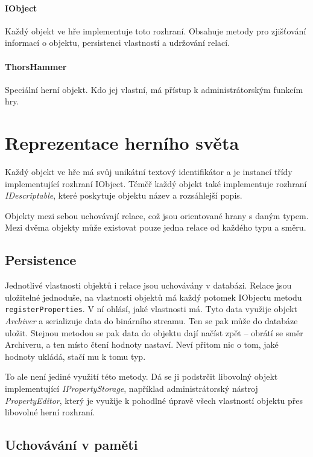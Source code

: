 \documentclass[11pt, a4paper]{article}
\def\class#1{\emph{#1}}
\begin{document}
\paragraph{IObject} Každý objekt ve hře implementuje toto rozhraní. Obsahuje metody pro zjišťování informací o objektu, persistenci vlastností a udržování relací.

\paragraph{ThorsHammer} Speciální herní objekt. Kdo jej vlastní, má přístup k administrátorským funkcím hry.

\section{Reprezentace herního světa}

Každý objekt ve hře má svůj unikátní textový identifikátor a je instancí třídy implementující rozhraní IObject. Téměř každý objekt také implementuje rozhraní \class{IDescriptable}, které poskytuje objektu název a rozsáhlejší popis. 

Objekty mezi sebou uchovávají relace, což jsou orientované hrany s daným typem. Mezi dvěma objekty může existovat pouze jedna relace od každého typu a směru.

\subsection{Persistence}

Jednotlivé vlastnosti objektů i relace jsou uchovávány v databázi. Relace jsou uložitelné jednoduše, na vlastnosti objektů má každý potomek IObjectu metodu \texttt{registerProperties}. V ní ohlásí, jaké vlastnosti má. Tyto data využije objekt \class{Archiver} a serializuje data do binárního streamu. Ten se pak může do databáze uložit. Stejnou metodou se pak data do objektu dají načíst zpět -- obrátí se směr Archiveru, a ten místo čtení hodnoty nastaví. Neví přitom nic o tom, jaké hodnoty ukládá, stačí mu k tomu typ.

To ale není jediné využití této metody. Dá se ji podstrčit libovolný objekt implementující \class{IPropertyStorage}, například administrátorský nástroj \class{PropertyEditor}, který je využije k pohodlné úpravě všech vlastností objektu přes libovolné herní rozhraní.

\subsection{Uchovávání v paměti}
\end{document}
